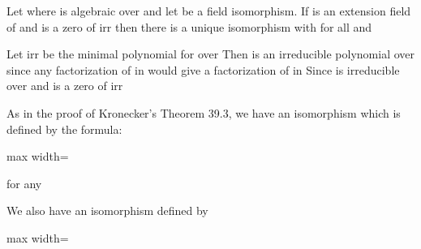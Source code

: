 \documentclass[11pt,oneside]{article}
\begin{document}
\begin{BookBody}

 Let  where \BookInline{\alpha } is algebraic over  and let  be a field isomorphism. If  is an extension field of  and  is a zero of irr then there is a unique isomorphism  with  for all  and 

 Let  irr be the minimal polynomial for \BookInline{\alpha } over  Then  is an irreducible polynomial over  since any factorization of  in  would give a factorization of  in  Since  is irreducible over  and \BookInline{\beta } is a zero of   irr

As in the proof of Kronecker’s Theorem 39.3, we have an isomorphism \BookInline{\psi _{\alpha }:}  which is defined by the formula:

\begin{center}\begin{adjustbox}{max width=\linewidth}\end{adjustbox}\end{center}

\noindent for any 

We also have an isomorphism  defined by

\begin{center}\begin{adjustbox}{max width=\linewidth}\end{adjustbox}\end{center}


\end{BookBody}
\end{document}
